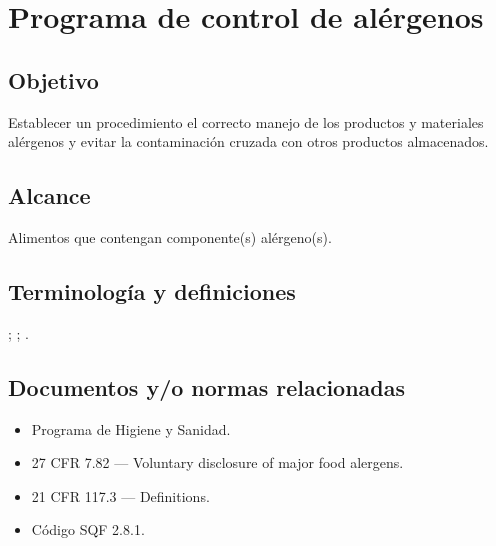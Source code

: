 \thispagestyle{formato-PI}
\renewcommand{\MayorVer}{2}
\renewcommand{\MenorVer}{0}
\renewcommand{\Titulo}{Programa de control de alérgenos}
\renewcommand{\TipoID}{ESP}
\renewcommand{\FechaPub}{2023--01}

\section{\Titulo}
\renewcommand{\Codigo}{\Prog--\thesection--\TipoID}

\subsection{Objetivo}
Establecer un procedimiento el correcto manejo de los productos y materiales alérgenos y evitar la contaminación cruzada con otros productos almacenados.

\subsection{Alcance}
Alimentos que contengan componente(s) alérgeno(s).

\subsection{Terminología y definiciones}
\begin{description}
	;
	;
	.
\end{description}

\subsection{Documentos y/o normas relacionadas}
\begin{itemize}
	\item Programa de Higiene y Sanidad.
	\item 27 CFR 7.82 --- Voluntary disclosure of major food alergens.
	\item 21 CFR 117.3 --- Definitions.
	\item Código SQF 2.8.1.
\end{itemize}

